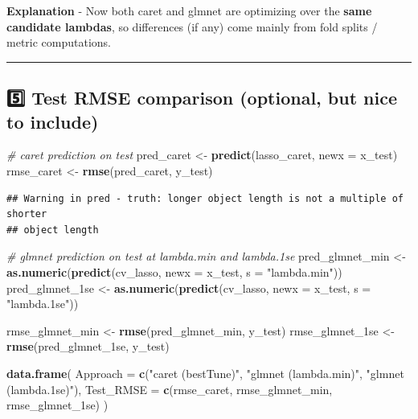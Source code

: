 \documentclass[
]{article}
\newenvironment{Shaded}{\begin{snugshade}}{\end{snugshade}}
\newcommand{\AttributeTok}[1]{\textcolor[rgb]{0.13,0.29,0.53}{#1}}
\newcommand{\CommentTok}[1]{\textcolor[rgb]{0.56,0.35,0.01}{\textit{#1}}}
\newcommand{\FunctionTok}[1]{\textcolor[rgb]{0.13,0.29,0.53}{\textbf{#1}}}
\newcommand{\NormalTok}[1]{#1}
\newcommand{\OtherTok}[1]{\textcolor[rgb]{0.56,0.35,0.01}{#1}}
\newcommand{\StringTok}[1]{\textcolor[rgb]{0.31,0.60,0.02}{#1}}
\begin{document}
\textbf{Explanation} - Now both caret and glmnet are optimizing over the
\textbf{same candidate lambdas}, so differences (if any) come mainly
from fold splits / metric computations.

\begin{center}\rule{0.5\linewidth}{0.5pt}\end{center}

\subsection{5️⃣ Test RMSE comparison (optional, but nice to
include)}\label{test-rmse-comparison-optional-but-nice-to-include}

\begin{Shaded}
\begin{Highlighting}[]
\CommentTok{\# caret prediction on test}
\NormalTok{pred\_caret }\OtherTok{\textless{}{-}} \FunctionTok{predict}\NormalTok{(lasso\_caret, }\AttributeTok{newx =}\NormalTok{ x\_test)}
\NormalTok{rmse\_caret }\OtherTok{\textless{}{-}} \FunctionTok{rmse}\NormalTok{(pred\_caret, y\_test)}
\end{Highlighting}
\end{Shaded}

\begin{verbatim}
## Warning in pred - truth: longer object length is not a multiple of shorter
## object length
\end{verbatim}

\begin{Shaded}
\begin{Highlighting}[]
\CommentTok{\# glmnet prediction on test at lambda.min and lambda.1se}
\NormalTok{pred\_glmnet\_min }\OtherTok{\textless{}{-}} \FunctionTok{as.numeric}\NormalTok{(}\FunctionTok{predict}\NormalTok{(cv\_lasso, }\AttributeTok{newx =}\NormalTok{ x\_test, }\AttributeTok{s =} \StringTok{"lambda.min"}\NormalTok{))}
\NormalTok{pred\_glmnet\_1se }\OtherTok{\textless{}{-}} \FunctionTok{as.numeric}\NormalTok{(}\FunctionTok{predict}\NormalTok{(cv\_lasso, }\AttributeTok{newx =}\NormalTok{ x\_test, }\AttributeTok{s =} \StringTok{"lambda.1se"}\NormalTok{))}

\NormalTok{rmse\_glmnet\_min }\OtherTok{\textless{}{-}} \FunctionTok{rmse}\NormalTok{(pred\_glmnet\_min, y\_test)}
\NormalTok{rmse\_glmnet\_1se }\OtherTok{\textless{}{-}} \FunctionTok{rmse}\NormalTok{(pred\_glmnet\_1se, y\_test)}

\FunctionTok{data.frame}\NormalTok{(}
  \AttributeTok{Approach =} \FunctionTok{c}\NormalTok{(}\StringTok{"caret (bestTune)"}\NormalTok{, }\StringTok{"glmnet (lambda.min)"}\NormalTok{, }\StringTok{"glmnet (lambda.1se)"}\NormalTok{),}
  \AttributeTok{Test\_RMSE =} \FunctionTok{c}\NormalTok{(rmse\_caret, rmse\_glmnet\_min, rmse\_glmnet\_1se)}
\NormalTok{)}
\end{Highlighting}
\end{Shaded}
\end{document}
